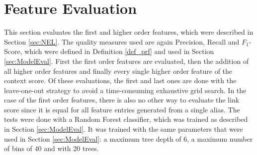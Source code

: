 \section{Feature Evaluation}
\label{sec:FeatureEval}
This section evaluates the first and higher order features, which were described in Section \ref{sec:NEL}. The quality measures used are again Precision, Recall and $F_1$-Score, which were defined in Definition \ref{def_prf} and used in Section \ref{sec:ModelEval}. First the first order features are evaluated, then the addition of all higher order features and finally every single higher order feature of the context score. Of these evaluations, the first and last ones are done with the leave-one-out strategy to avoid a time-consuming exhaustive grid search. In the case of the first order features, there is also no other way to evaluate the link score since it is equal for all feature entries generated from a single alias. The tests were done with a Random Forest classifier, which was trained as described in Section \ref{sec:ModelEval}. It was trained with the same parameters that were used in Section \ref{sec:ModelEval}: a maximum tree depth of 6, a maximum number of bins of 40 and with 20 trees.\par


